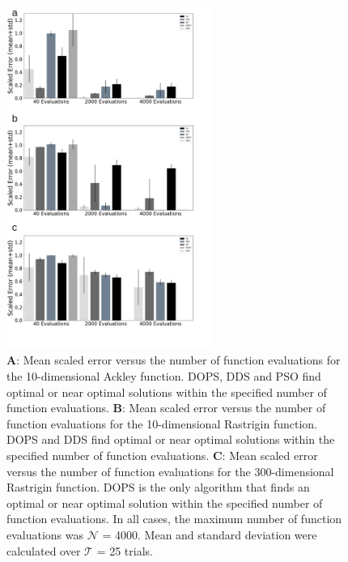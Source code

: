 \documentclass{bmcart}
\begin{document}
\begin{backmatter}
\begin{figure}[h!]
\centering
\includegraphics[width=0.60\textwidth]{./rachelfigs/fig2cropped.pdf}
\caption{
\textbf{A}: Mean scaled error versus the number of function evaluations for the 10-dimensional Ackley function. DOPS, DDS and PSO find optimal or near optimal solutions within the specified number of function evaluations.
\textbf{B}: Mean scaled error versus the number of function evaluations for the 10-dimensional Rastrigin function. DOPS and DDS find optimal or near optimal solutions within the specified number of function evaluations.
\textbf{C}: Mean scaled error versus the number of function evaluations for the 300-dimensional Rastrigin function. DOPS is the only algorithm that finds an optimal or near optimal solution within the specified number of function evaluations. In all cases, the maximum number of function evaluations was $\mathcal{N}$ = 4000. Mean and standard deviation were calculated over $\mathcal{T}$ = 25 trials. }\label{fig-testfunctions}
\end{figure}


\end{backmatter}
\end{document}
